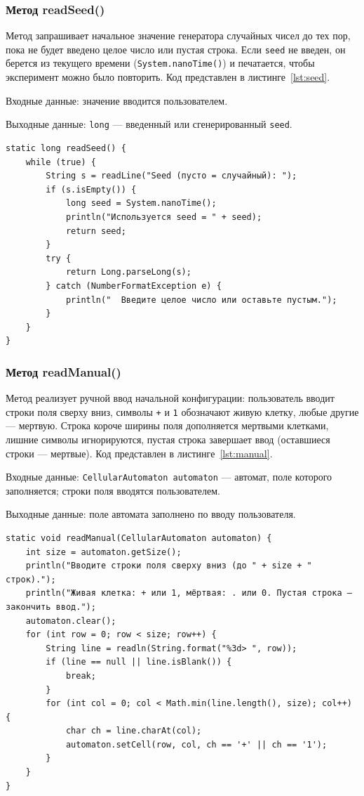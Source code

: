 \documentclass[a4paper,14pt]{extarticle}
\begin{document}
\subsubsection*{Метод readSeed()}

Метод запрашивает начальное значение генератора случайных чисел до тех пор, пока не будет введено целое число или пустая строка. Если \texttt{seed} не введен, он берется из текущего времени (\texttt{System.nanoTime()}) и печатается, чтобы эксперимент можно было повторить. Код представлен в листинге~\ref{lst:seed}.

Входные данные: значение вводится пользователем.

Выходные данные: \texttt{long} --- введенный или сгенерированный \texttt{seed}.

\begin{lstlisting}[caption={Метод readSeed()}, label={lst:seed}]
static long readSeed() {
	while (true) {
		String s = readLine("Seed (пусто = случайный): ");
		if (s.isEmpty()) {
			long seed = System.nanoTime();
			println("Используется seed = " + seed);
			return seed;
		}
		try {
			return Long.parseLong(s);
		} catch (NumberFormatException e) {
			println("  Введите целое число или оставьте пустым.");
		}
	}
}
\end{lstlisting}

\subsubsection*{Метод readManual()}

Метод реализует ручной ввод начальной конфигурации: пользователь вводит строки поля сверху вниз, символы \texttt{+} и \texttt{1} обозначают живую клетку, любые другие --- мертвую. Строка короче ширины поля дополняется мертвыми клетками, лишние символы игнорируются, пустая строка завершает ввод (оставшиеся строки --- мертвые). Код представлен в листинге~\ref{lst:manual}.

Входные данные: \texttt{CellularAutomaton automaton} --- автомат, поле которого заполняется; строки поля вводятся пользователем.

Выходные данные: поле автомата заполнено по вводу пользователя.

\begin{lstlisting}[caption={Метод readManual()}, label={lst:manual}]
static void readManual(CellularAutomaton automaton) {
	int size = automaton.getSize();
	println("Вводите строки поля сверху вниз (до " + size + " строк).");
	println("Живая клетка: + или 1, мёртвая: . или 0. Пустая строка — закончить ввод.");
	automaton.clear();
	for (int row = 0; row < size; row++) {
		String line = readln(String.format("%3d> ", row));
		if (line == null || line.isBlank()) {
			break;
		}
		for (int col = 0; col < Math.min(line.length(), size); col++) {
			char ch = line.charAt(col);
			automaton.setCell(row, col, ch == '+' || ch == '1');
		}
	}
}
\end{lstlisting}
\end{document}
